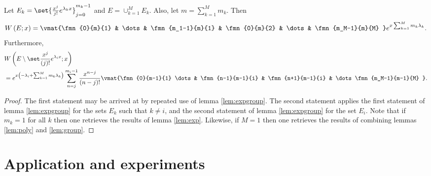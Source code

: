 \documentclass{article}
\begin{document}
\newcommand{\efull}{e^{x \sum_{k=1}^M m_k \lambda_k} }
\newcommand{\eclose}{e^{x \left ( -\lambda_i + \sum_{k=1}^M m_k \lambda_k \right ) } }

\begin{cor}
Let $E_k = \set{\Poly{j} e^{\lambda_k x}}_{j=0}^{m_k-1}$ and $E = \cup_{k=1}^M E_k$.
Also, let $m = \sum_{k=1}^M m_k$.
Then 
\begin{equation*}
\W{E}{x} = \vmat{\fmn{0}{m}{1} & \dots & \fmn{m_1-1}{m}{1} & \fmn{0}{m}{2} & \dots & \fmn{m_M-1}{m}{M} } \efull .
\end{equation*}
Furthermore,
\begin{align*}
& \Wspec{j}{i} \\
& = \eclose \sum_{n=j}^{m_i-1} \poly{n-j} \vmat{\fmn{0}{m-1}{1} \dots & \fmn{n-1}{m-1}{i} & \fmn{n+1}{m-1}{i} & \dots \fmn{m_M-1}{m-1}{M} } .
\end{align*}
\end{cor}

\begin{proof}
The first statement may be arrived at by repeated use of lemma \ref{lem:expgroup}.
The second statement applies the first statement of lemma \ref{lem:expgroup} for the sets $E_k$ such that $k \neq i$, and the second statement of lemma \ref{lem:expgroup} for the set $E_i$.
Note that if $m_k=1$ for all $k$ then one retrieves the results of lemma \ref{lem:exp}.
Likewise, if $M=1$ then one retrieves the results of combining lemmas \ref{lem:poly} and \ref{lem:group}.
\end{proof}

\section{Application and experiments}
\end{document}
